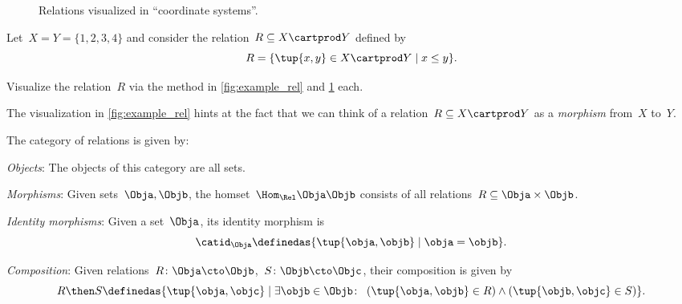 \begin{figure}[h!]
  \begin{center}
  \end{center}
  \caption{Relations visualized in ``coordinate systems''.}
  \label{fig:example_rel_coord}
\end{figure}

\begin{exercise}
  Let~$X = Y = \{1, 2, 3, 4 \}$ and consider the relation~$R \subseteq X \cartprod Y$ defined by
  \begin{equation}
    R = \{ \tup{x,y} \in X \cartprod Y \mid x \leq y \}.
  \end{equation}

  Visualize the relation~$R$ via the method in \cref{fig:example_rel} and \cref{fig:example_rel_coord} each.
\end{exercise}

The visualization in \cref{fig:example_rel} hints at the fact that we can think of a relation~$R \subseteq X \cartprod Y$ as a \emph{morphism} from~$X$ to~$Y$.

\begin{ctdefinition}
  \label{def:Rel}
  The category of relations \iindex{\Rel}  is given by:
  \begin{compactenum}
    \item \emph{Objects}: The objects of this category are all sets.
    \item \emph{Morphisms}: Given sets~$\Obja, \Objb$, the homset~$\Hom_{\Rel}{\Obja}{\Objb}$ consists of all
    relations~$R\subseteq \Obja\times \Objb$.
    \item \emph{Identity morphisms}: Given a set~$\Obja$, its identity morphism is
    \begin{equation}
      \catid_\Obja \definedas \{ \tup{\obja,\objb} \mid  \obja = \objb \}.
    \end{equation}
    \item \emph{Composition}: Given relations~$R \colon \Obja\cto \Objb$,~$S\colon \Objb\cto \Objc$, their composition is given by
    \begin{equation}
      \label{eq:RelCompRule}
      R \then S \definedas \{\tup{\obja,\objc} \mid  \exists \objb \in \Objb \colon \ \left(\tup{\obja,\objb} \in R\right) \wedge \left(\tup{\objb,\objc} \in S\right)\}.
    \end{equation}
  \end{compactenum}
\end{ctdefinition}

